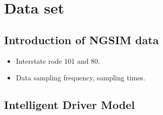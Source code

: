 \chapter{Data set}
\label{chapter:dataset}

\section{Introduction of NGSIM data}

\begin{itemize}
\item Interstate rode 101 and 80.
\item Data sampling frequency, sampling times.
\end{itemize}

\section{Intelligent Driver Model}

